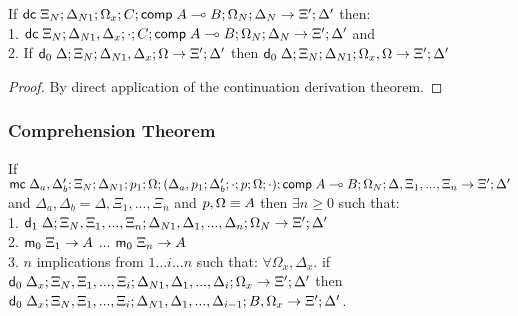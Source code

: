 If $\mathsf{dc} \; \Xi_N; \Delta_{N1}; \Omega_x; C; \mathsf{comp} \; A \multimap B; \Omega_N; \Delta_N \rightarrow \Xi'; \Delta'$ then: \\
1. \hspace{1cm} $\mathsf{dc} \; \Xi_N; \Delta_{N1}, \Delta_x; \cdot; C; \mathsf{comp} \; A \multimap B; \Omega_N; \Delta_N \rightarrow \Xi'; \Delta'$ and \\
2. \hspace{1cm} If $\mathsf{d}_0 \; \Delta; \Xi_N; \Delta_{N1}, \Delta_x; \Omega \rightarrow \Xi'; \Delta'$ then $\mathsf{d}_0 \; \Delta; \Xi_N; \Delta_{N1}; \Omega_x, \Omega \rightarrow \Xi'; \Delta'$

\begin{proof}
   By direct application of the continuation derivation theorem.
\end{proof}

\subsubsection{Comprehension Theorem}

If $\mathsf{mc} \; \Delta_a, \Delta'_b; \Xi_N; \Delta_{N1}; p_1; \Omega; (\Delta_a, p_1; \Delta'_b; \cdot; p; \Omega; \cdot); \mathsf{comp} \; A \multimap B; \Omega_N; \Delta, \Xi_1, ..., \Xi_n \rightarrow \Xi'; \Delta'$ and $\Delta_a, \Delta_b = \Delta, \Xi_1, ..., \Xi_n$ and $p, \Omega \equiv A$ then $\exists n \geq 0$ such that: \\
1. \hspace{1cm} $\mathsf{d}_1 \; \Delta; \Xi_N, \Xi_1, ..., \Xi_n; \Delta_{N1}, \Delta_1, ..., \Delta_n; \Omega_N \rightarrow \Xi'; \Delta'$\\
2. \hspace{1cm} $\mathsf{m}_0 \; \Xi_1 \rightarrow A$ ... $\mathsf{m}_0 \; \Xi_n \rightarrow A$ \\
3. \hspace{1cm} $n$ implications from $1 ... i ... n$ such that: $\forall \Omega_x, \Delta_x.$ if $\mathsf{d}_0 \; \Delta_x; \Xi_N, \Xi_1, ..., \Xi_i; \Delta_{N1}, \Delta_1, ..., \Delta_i; \Omega_x \rightarrow \Xi'; \Delta'$ then $\mathsf{d}_0 \; \Delta_x; \Xi_N, \Xi_1, ..., \Xi_i; \Delta_{N1}, \Delta_1, ..., \Delta_{i-1}; B, \Omega_x \rightarrow \Xi'; \Delta'$.

